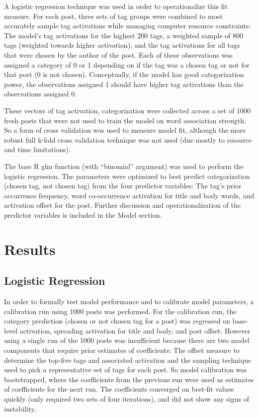 \documentclass[10pt,letterpaper]{article}
\begin{document}
A logistic regression technique was used in order to operationalize this fit measure.
For each post, three sets of tag groups were combined to most accurately sample tag activations while managing computer resource constraints:
The model's tag activations for the highest 200 tags, a weighted sample of 800 tags (weighted towards higher activation), and the tag activations for all tags that were chosen by the author of the post.
Each of these observations was assigned a category of 0 or 1 depending on if the tag was a chosen tag or not for that post (0 is not chosen).
Conceptually, if the model has good categorization power, the observations assigned 1 should have higher tag activations than the observations assigned 0.

These vectors of tag activation, categorization were collected across a set of \num{1000} fresh posts that were not used to train the model on word association strength.
So a form of cross validation was used to measure model fit, although the more robust full k-fold cross validation technique was not used (due mostly to resource and time limitations).

The base R glm function (with ``binomial'' argument) was used to perform the logistic regression.
The parameters were optimized to best predict categorization (chosen tag, not chosen tag) from the four predictor variables:
The tag's prior occurrence frequency, word co-occurrence activation for title and body words, and activation offset for the post.
Further discussion and operationalization of the predictor variables is included in the Model section.

\section{Results}

\subsection{Logistic Regression}

In order to formally test model performance and to calibrate model parameters, a calibration run using \num{1000} posts was performed.
For the calibration run, the category prediction (chosen or not chosen tag for a post) was regressed on base-level activation, spreading activation for title and body, and post offset.
However using a single run of the \num{1000} posts was insufficient because there are two model components that require prior estimates of coefficients:
The offset measure to determine the top-five tags and associated activation and the sampling technique used to pick a representative set of tags for each post.
So model calibration was bootstrapped, where the coefficients from the previous run were used as estimates of coefficients for the next run.
The coefficients converged on best-fit values quickly (only required two sets of four iterations), and did not show any signs of instability.
\end{document}

